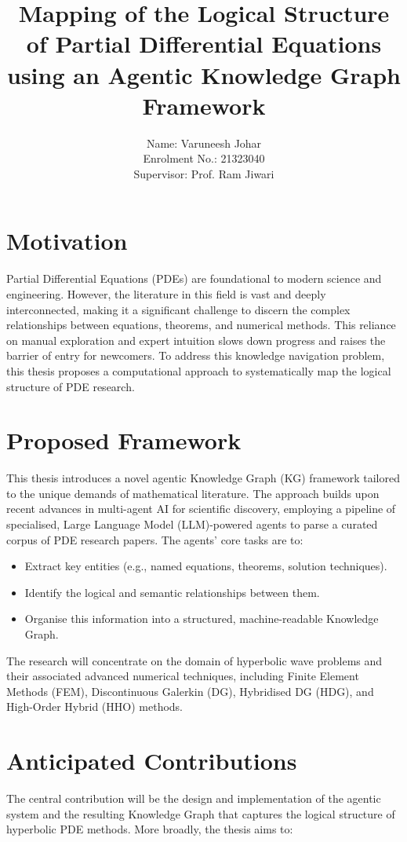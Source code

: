 \documentclass[10pt]{article}
\title{Mapping of the Logical Structure of Partial Differential Equations using an Agentic Knowledge Graph Framework }
\author{Name: Varuneesh Johar\\
Enrolment No.: 21323040\\
Supervisor: Prof. Ram Jiwari}
\date{}
\begin{document}
\maketitle


\section*{Motivation}
Partial Differential Equations (PDEs) are foundational to modern science and engineering. However, the literature in this field is vast and deeply interconnected, making it a significant challenge to discern the complex relationships between equations, theorems, and numerical methods. This reliance on manual exploration and expert intuition slows down progress and raises the barrier of entry for newcomers. To address this knowledge navigation problem, this thesis proposes a computational approach to systematically map the logical structure of PDE research.

\section*{Proposed Framework}
This thesis introduces a novel agentic Knowledge Graph (KG) framework tailored to the unique demands of mathematical literature. The approach builds upon recent advances in multi-agent AI for scientific discovery, employing a pipeline of specialised, Large Language Model (LLM)-powered agents to parse a curated corpus of PDE research papers. The agents' core tasks are to:

\begin{itemize}
  \item Extract key entities (e.g., named equations, theorems, solution techniques).
  \item Identify the logical and semantic relationships between them.
  \item Organise this information into a structured, machine-readable Knowledge Graph.
\end{itemize}

The research will concentrate on the domain of hyperbolic wave problems and their associated advanced numerical techniques, including Finite Element Methods (FEM), Discontinuous Galerkin (DG), Hybridised DG (HDG), and High-Order Hybrid (HHO) methods.

\section*{Anticipated Contributions}
The central contribution will be the design and implementation of the agentic system and the resulting Knowledge Graph that captures the logical structure of hyperbolic PDE methods. More broadly, the thesis aims to:
\end{document}
